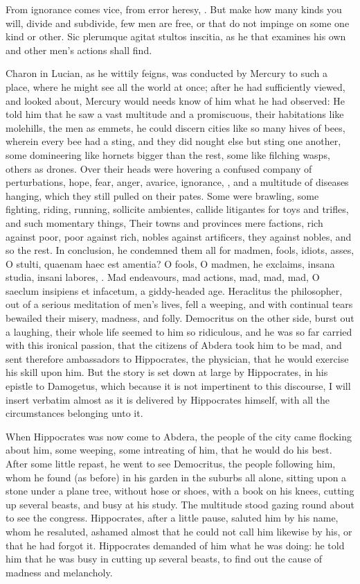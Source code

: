 {From ignorance comes vice, from error heresy, \etc. But make how many
kinds you will, divide and subdivide, few men are free, or that do not
impinge on some one kind or other. Sic plerumque agitat stultos
inscitia, as he that examines his own and other men's actions shall
find.

Charon in Lucian, as he wittily feigns, was conducted by Mercury
to such a place, where he might see all the world at once; after he had
sufficiently viewed, and looked about, Mercury would needs know of him
what he had observed: He told him that he saw a vast multitude and a
promiscuous, their habitations like molehills, the men as emmets, he
could discern cities like so many hives of bees, wherein every bee had
a sting, and they did nought else but sting one another, some
domineering like hornets bigger than the rest, some like filching
wasps, others as drones. Over their heads were hovering a confused
company of perturbations, hope, fear, anger, avarice, ignorance, \etc{},
and a multitude of diseases hanging, which they still pulled on their
pates. Some were brawling, some fighting, riding, running, sollicite
ambientes, callide litigantes for toys and trifles, and such momentary
things, Their towns and provinces mere factions, rich against poor,
poor against rich, nobles against artificers, they against nobles, and
so the rest. In conclusion, he condemned them all for madmen, fools,
idiots, asses, O stulti, quaenam haec est amentia? O fools, O madmen,
he exclaims, insana studia, insani labores, \etc{}. Mad endeavours, mad
actions, mad, mad, mad, O saeclum insipiens et infacetum, a
giddy-headed age. Heraclitus the philosopher, out of a serious
meditation of men's lives, fell a weeping, and with continual tears
bewailed their misery, madness, and folly. Democritus on the other
side, burst out a laughing, their whole life seemed to him so
ridiculous, and he was so far carried with this ironical passion, that
the citizens of Abdera took him to be mad, and sent therefore
ambassadors to Hippocrates, the physician, that he would exercise his
skill upon him. But the story is set down at large by Hippocrates, in
his epistle to Damogetus, which because it is not impertinent to this
discourse, I will insert verbatim almost as it is delivered by
Hippocrates himself, with all the circumstances belonging unto it.

When Hippocrates was now come to Abdera, the people of the city came
flocking about him, some weeping, some intreating of him, that he would
do his best. After some little repast, he went to see Democritus, the
people following him, whom he found (as before) in his garden in the
suburbs all alone, sitting upon a stone under a plane tree,
without hose or shoes, with a book on his knees, cutting up several
beasts, and busy at his study. The multitude stood gazing round about
to see the congress. Hippocrates, after a little pause, saluted him by
his name, whom he resaluted, ashamed almost that he could not call him
likewise by his, or that he had forgot it. Hippocrates demanded of him
what he was doing: he told him that he was busy in cutting up
several beasts, to find out the cause of madness and melancholy.

}
